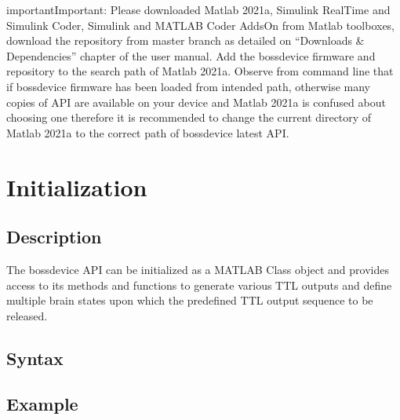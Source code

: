 \documentclass[letterpaper,10pt,english]{sphinxmanual}
\begin{document}
\begin{sphinxadmonition}{important}{Important:}
\sphinxAtStartPar
Please downloaded Matlab 2021a, Simulink Real\sphinxhyphen{}Time and Simulink Coder, Simulink and MATLAB Coder Adds\sphinxhyphen{}On from Matlab toolboxes, download the repository from master branch as detailed on “Downloads \& Dependencies” chapter of the user manual. Add the bossdevice firmware and repository to the search path of Matlab 2021a. Observe from command line that if bossdevice firmware has been loaded from intended path, otherwise many copies of API are available on your device and Matlab 2021a is confused about choosing one therefore it is recommended to change the current directory of Matlab 2021a to the correct path of bossdevice latest API.
\end{sphinxadmonition}


\section{Initialization}
\label{\detokenize{4_api_documentation:initialization}}

\subsection{Description}
\label{\detokenize{4_api_documentation:description}}
\sphinxAtStartPar
The bossdevice API can be initialized as a MATLAB Class object and provides access to its methods and functions to generate various TTL outputs and define multiple brain states upon which the predefined TTL output sequence to be released.


\subsection{Syntax}
\label{\detokenize{4_api_documentation:syntax}}
\begin{sphinxVerbatim}[commandchars=\\\{\}]
\PYG{p}{[}\PYG{p}{]}
\end{sphinxVerbatim}


\subsection{Example}
\label{\detokenize{4_api_documentation:example}}
\begin{sphinxVerbatim}[commandchars=\\\{\}]
\end{sphinxVerbatim}
\end{document}
